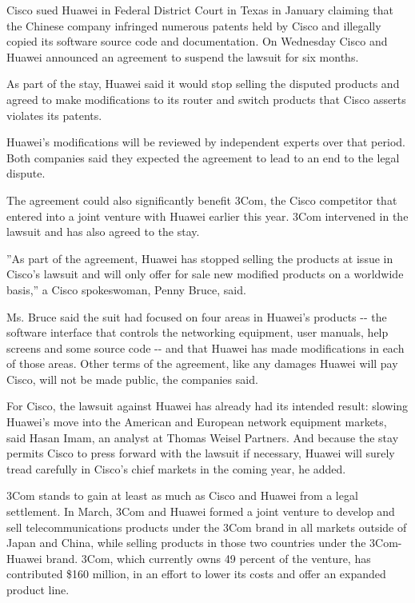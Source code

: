 Cisco sued Huawei in Federal District Court in Texas in January claiming
that the Chinese company infringed numerous patents held by Cisco and
illegally copied its software source code and documentation. On
Wednesday Cisco and Huawei announced an agreement to suspend the lawsuit
for six months.

As part of the stay, Huawei said it would stop selling the disputed
products and agreed to make modifications to its router and switch
products that Cisco asserts violates its patents.

Huawei's modifications will be reviewed by independent experts over that
period. Both companies said they expected the agreement to lead to an
end to the legal dispute.

The agreement could also significantly benefit 3Com, the Cisco
competitor that entered into a joint venture with Huawei earlier this
year. 3Com intervened in the lawsuit and has also agreed to the stay.

''As part of the agreement, Huawei has stopped selling the products at
issue in Cisco's lawsuit and will only offer for sale new modified
products on a worldwide basis,'' a Cisco spokeswoman, Penny Bruce, said.

Ms. Bruce said the suit had focused on four areas in Huawei's products
-\/- the software interface that controls the networking equipment, user
manuals, help screens and some source code -\/- and that Huawei has made
modifications in each of those areas. Other terms of the agreement, like
any damages Huawei will pay Cisco, will not be made public, the
companies said.

For Cisco, the lawsuit against Huawei has already had its intended
result: slowing Huawei's move into the American and European network
equipment markets, said Hasan Imam, an analyst at Thomas Weisel
Partners. And because the stay permits Cisco to press forward with the
lawsuit if necessary, Huawei will surely tread carefully in Cisco's
chief markets in the coming year, he added.

3Com stands to gain at least as much as Cisco and Huawei from a legal
settlement. In March, 3Com and Huawei formed a joint venture to develop
and sell telecommunications products under the 3Com brand in all markets
outside of Japan and China, while selling products in those two
countries under the 3Com-Huawei brand. 3Com, which currently owns 49
percent of the venture, has contributed \$160 million, in an effort to
lower its costs and offer an expanded product line.

